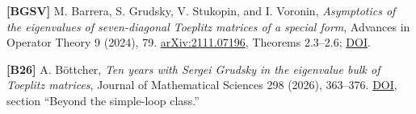 \documentclass[10pt,a4paper]{article}
\begin{document}
\textbf{{[}BGSV{]}} M. Barrera, S. Grudsky, V. Stukopin, and I. Voronin, \emph{Asymptotics of the eigenvalues of seven-diagonal Toeplitz matrices of a special form}, Advances in Operator Theory 9 (2024), 79. \href{https://arxiv.org/abs/2111.07196}{arXiv:2111.07196}, Theorems 2.3--2.6; \href{https://doi.org/10.1007/s43036-024-00374-1}{DOI}.

\textbf{{[}B26{]}} A. Böttcher, \emph{Ten years with Sergei Grudsky in the eigenvalue bulk of Toeplitz matrices}, Journal of Mathematical Sciences 298 (2026), 363--376. \href{https://doi.org/10.1007/s10958-025-07833-x}{DOI}, section ``Beyond the simple-loop class.''
\end{document}
